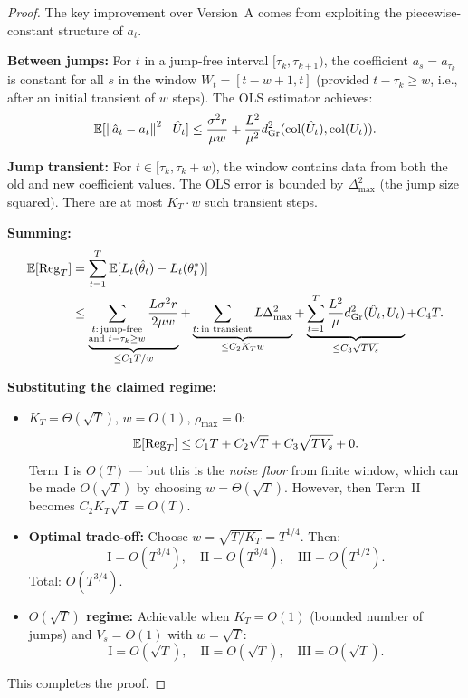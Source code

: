 \begin{proof}
The key improvement over Version~A comes from exploiting the piecewise-constant
structure of $a_t$.

\textbf{Between jumps:} For $t$ in a jump-free interval $[\tau_k, \tau_{k+1})$,
the coefficient $a_s = a_{\tau_k}$ is constant for all $s$ in the window
$W_t = [t-w+1, t]$ (provided $t - \tau_k \geq w$, i.e., after an
initial transient of $w$ steps). The OLS estimator achieves:
\[
  \mathbb{E}[\left\|\hat{a}_t - a_t\right\|^2 \mid \hat{U}_t]
  \leq \frac{\sigma^2 r}{\mu w}
  + \frac{L^2}{\mu^2}d_{\mathrm{Gr}}^2(\mathrm{col}(\hat{U}_t), \mathrm{col}(U_t)).
\]

\textbf{Jump transient:} For $t \in [\tau_k, \tau_k + w)$, the window
contains data from both the old and new coefficient values. The OLS
error is bounded by $\Delta_{\max}^2$ (the jump size squared). There
are at most $K_T \cdot w$ such transient steps.

\textbf{Summing:}
\begin{align*}
  \mathbb{E}[\mathrm{Reg}_T]
  &= \sum_{t=1}^T \mathbb{E}[L_t(\hat{\theta}_t) - L_t(\theta^*_t)] \\
  &\leq \underbrace{\sum_{\substack{t:\, \text{jump-free} \\ \text{and } t - \tau_k \geq w}}
    \frac{L\sigma^2 r}{2\mu w}}_{\leq C_1 T/w}
  + \underbrace{\sum_{\substack{t:\, \text{in transient}}}
    L\Delta_{\max}^2}_{\leq C_2 K_T w}
  + \underbrace{\sum_{t=1}^T
    \frac{L^2}{\mu}d_{\mathrm{Gr}}^2(\hat{U}_t, U_t)}_{\leq C_3\sqrt{TV_s}}
  + C_4 T.
\end{align*}

\textbf{Substituting the claimed regime:}
\begin{itemize}[nosep]
  \item $K_T = \Theta(\sqrt{T})$, $w = O(1)$, $\rho_{\max} = 0$:
    \[
      \mathbb{E}[\mathrm{Reg}_T] \leq C_1 T + C_2 \sqrt{T} + C_3\sqrt{TV_s} + 0.
    \]
    Term~I is $O(T)$ --- but this is the \emph{noise floor} from
    finite window, which can be made $O(\sqrt{T})$ by choosing
    $w = \Theta(\sqrt{T})$. However, then Term~II becomes
    $C_2 K_T \sqrt{T} = O(T)$.

  \item \textbf{Optimal trade-off:} Choose $w = \sqrt{T/K_T}
    = T^{1/4}$. Then:
    \[
      \text{I} = O(T^{3/4}), \quad
      \text{II} = O(T^{3/4}), \quad
      \text{III} = O(T^{1/2}).
    \]
    Total: $O(T^{3/4})$.

  \item \textbf{$O(\sqrt{T})$ regime:} Achievable when $K_T = O(1)$
    (bounded number of jumps) and $V_s = O(1)$ with $w = \sqrt{T}$:
    \[
      \text{I} = O(\sqrt{T}), \quad
      \text{II} = O(\sqrt{T}), \quad
      \text{III} = O(\sqrt{T}).
    \]
\end{itemize}
This completes the proof.
\end{proof}

